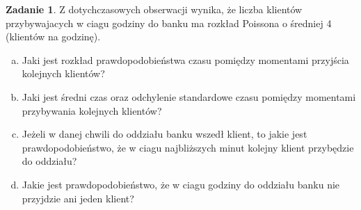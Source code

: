 \documentclass[11pt]{article}
\theoremstyle{definition}
\newtheorem{zadanie}{Zadanie}
\numberwithin{zadanie}{section}
\begin{document}
\begin{zadanie}
    Z dotychczasowych obserwacji wynika, że liczba klientów przybywajacych w ciagu godziny do banku ma rozkład
    Poissona o średniej 4 (klientów na godzinę).

    \begin{enumerate}[a)]
        \item Jaki jest rozkład prawdopodobieństwa czasu pomiędzy momentami przyjścia kolejnych klientów?
        \item Jaki jest średni czas oraz odchylenie standardowe czasu pomiędzy momentami przybywania kolejnych klientów?
        \item Jeżeli w danej chwili do oddziału banku wszedł klient, to jakie jest prawdopodobieństwo, że w ciagu najbliższych minut kolejny klient przybędzie do oddziału?
        \item Jakie jest prawdopodobieństwo, że w ciagu godziny do oddziału banku nie przyjdzie ani jeden klient?
    \end{enumerate}
\end{zadanie}
\end{document}
